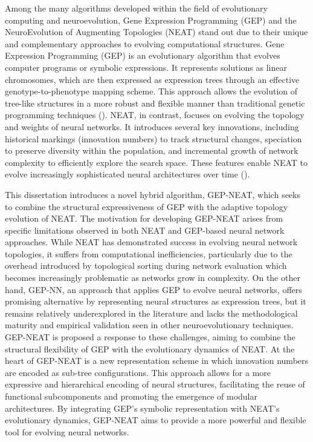 \noindent Among the many algorithms developed within the field of evolutionary computing and neuroevolution, Gene Expression Programming (GEP) and the NeuroEvolution of Augmenting Topologies (NEAT) stand out due to their unique and complementary approaches to evolving computational structures. Gene Expression Programming (GEP) is an evolutionary algorithm that evolves computer programs or symbolic expressions. It represents solutions as linear chromosomes, which are then expressed as expression trees through an effective genotype-to-phenotype mapping scheme. This approach allows the evolution of tree-like structures in a more robust and flexible manner than traditional genetic programming techniques (\cite{ferreira2006gene}). NEAT, in contrast, focuses on evolving the topology and weights of neural networks. It introduces several key innovations, including historical markings (innovation numbers) to track structural changes, speciation to preserve diversity within the population, and incremental growth of network complexity to efficiently explore the search space. These features enable NEAT to evolve increasingly sophisticated neural architectures over time (\cite{stanley2002evolving}). \bigskip

\noindent This dissertation introduces a novel hybrid algorithm, GEP-NEAT, which seeks to combine the structural expressiveness of GEP with the adaptive topology evolution of NEAT. The motivation for developing GEP-NEAT arises from specific limitations observed in both NEAT and GEP-based neural network approaches. While NEAT has demonstrated success in evolving neural network topologies, it suffers from computational inefficiencies, particularly due to the overhead introduced by topological sorting during network evaluation which becomes increasingly problematic as networks grow in complexity. On the other hand, GEP-NN, an approach that applies GEP to evolve neural networks, offers promising alternative by representing neural structures as expression trees, but it remains relatively underexplored in the literature and lacks the methodological maturity and empirical validation seen in other neuroevolutionary techniques. GEP-NEAT is proposed a response to these challenges, aiming to combine the structural flexibility of GEP with the evolutionary dynamics of NEAT. At the heart of GEP-NEAT is a new representation scheme in which innovation numbers are encoded as sub-tree configurations. This approach allows for a more expressive and hierarchical encoding of neural structures, facilitating the reuse of functional subcomponents and promoting the emergence of modular architectures. By integrating GEP's symbolic representation with NEAT's evolutionary dynamics, GEP-NEAT aims to provide a more powerful and flexible tool for evolving neural networks.

